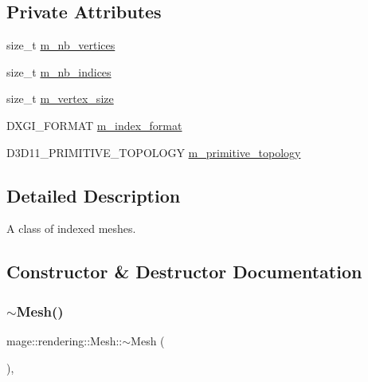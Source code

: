 \subsection*{Private Attributes}
\begin{DoxyCompactItemize}
\item 
size\+\_\+t \hyperlink{classmage_1_1rendering_1_1_mesh_a877873f0736375cdaa2d26066d7aa2ae}{m\+\_\+nb\+\_\+vertices}
\item 
size\+\_\+t \hyperlink{classmage_1_1rendering_1_1_mesh_a103e49bac28a4551816ec453e7261213}{m\+\_\+nb\+\_\+indices}
\item 
size\+\_\+t \hyperlink{classmage_1_1rendering_1_1_mesh_a52a754eeef69dfa642dc483025f7bb21}{m\+\_\+vertex\+\_\+size}
\item 
D\+X\+G\+I\+\_\+\+F\+O\+R\+M\+AT \hyperlink{classmage_1_1rendering_1_1_mesh_a3de0213af57c9d423399ad22fd6ae7c0}{m\+\_\+index\+\_\+format}
\item 
D3\+D11\+\_\+\+P\+R\+I\+M\+I\+T\+I\+V\+E\+\_\+\+T\+O\+P\+O\+L\+O\+GY \hyperlink{classmage_1_1rendering_1_1_mesh_a9ae7ea29fac3acb3fe17317c21242ee9}{m\+\_\+primitive\+\_\+topology}
\end{DoxyCompactItemize}


\subsection{Detailed Description}
A class of indexed meshes. 

\subsection{Constructor \& Destructor Documentation}
\hypertarget{classmage_1_1rendering_1_1_mesh_a3f0a53becc293987d7ecf9ca34a230d8}{}\label{classmage_1_1rendering_1_1_mesh_a3f0a53becc293987d7ecf9ca34a230d8} 
\subsubsection{\texorpdfstring{$\sim$\+Mesh()}{~Mesh()}}
{\footnotesize\ttfamily mage\+::rendering\+::\+Mesh\+::$\sim$\+Mesh (\begin{DoxyParamCaption}{ }\end{DoxyParamCaption})\hspace{0.3cm}{\ttfamily [virtual]}, {\ttfamily [default]}}

